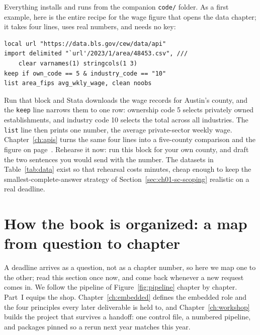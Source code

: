 \documentclass[
    a4paper,
    fontsize=10pt,
    twoside=true,
    numbers=noenddot,
]{kaobook}
\begin{document}
Everything installs and runs from the companion \texttt{code/} folder. As a first example, here is the entire recipe for the wage figure that opens the data chapter; it takes four lines, uses real numbers, and needs no key:
\par
{\footnotesize
\begin{verbatim}
local url "https://data.bls.gov/cew/data/api"
import delimited "`url'/2023/1/area/48453.csv", ///
    clear varnames(1) stringcols(1 3)
keep if own_code == 5 & industry_code == "10"
list area_fips avg_wkly_wage, clean noobs
\end{verbatim}
}
Run that block and Stata downloads the wage records for Austin's county, and the \texttt{keep} line narrows them to one row: ownership code 5 selects privately owned establishments, and industry code 10 selects the total across all industries. The \texttt{list} line then prints one number, the average private-sector weekly wage. Chapter~\ref{ch:apis} turns the same four lines into a five-county comparison and the figure on page~\pageref{fig:qcew}. Rehearse it now: run this block for your own county, and draft the two sentences you would send with the number. The datasets in Table~\ref{tab:data} exist so that rehearsal costs minutes, cheap enough to keep the smallest-complete-answer strategy of Section~\ref{sec:ch01-sc-scoping} realistic on a real deadline.

\section{How the book is organized: a map from question to chapter}
A deadline arrives as a question, not as a chapter number, so here we map one to the other; read this section once now, and come back whenever a new request comes in. We follow the pipeline of Figure~\ref{fig:pipeline} chapter by chapter. Part~I equips the shop. Chapter~\ref{ch:embedded} defines the embedded role and the four principles every later deliverable is held to, and Chapter~\ref{ch:workshop} builds the project that survives a handoff: one control file, a numbered pipeline, and packages pinned so a rerun next year matches this year.
\end{document}
